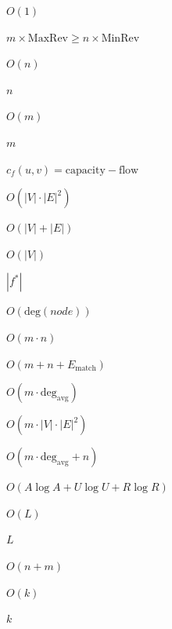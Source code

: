\documentclass{article}
\begin{document}
$O(1)$
\pagebreak

$ m \times \text{MaxRev} \geq n \times \text{MinRev} $
\pagebreak

$O(n)$
\pagebreak

$n$
\pagebreak

$O(m)$
\pagebreak

$m$
\pagebreak

$ c_f(u,v) = \text{capacity} - \text{flow} $
\pagebreak

$O(|V| \cdot |E|^2)$
\pagebreak

$O(|V| + |E|)$
\pagebreak

$O(|V|)$
\pagebreak

$|f^*|$
\pagebreak

$O(\text{deg}(node))$
\pagebreak

$O(m \cdot n)$
\pagebreak

$O(m + n + E_{\text{match}})$
\pagebreak

$O(m \cdot \text{deg}_{\text{avg}})$
\pagebreak

$O(m \cdot |V| \cdot |E|^2)$
\pagebreak

$O(m \cdot \text{deg}_{\text{avg}} + n)$
\pagebreak

$O(A \log A + U \log U + R \log R)$
\pagebreak

$O(L)$
\pagebreak

$L$
\pagebreak

$O(n + m)$
\pagebreak

$O(k)$
\pagebreak

$k$
\pagebreak
\end{document}
